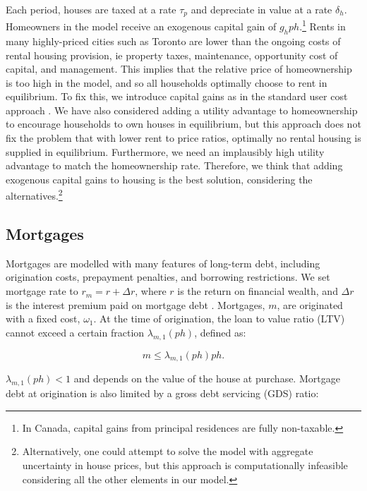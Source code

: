 \documentclass[parskip=full]{article}
\begin{document}
Each period, houses are taxed at a rate $\tau_{p}$ and depreciate in value at a rate $\delta_h$. Homeowners in the model receive an exogenous capital gain of $g_{h}ph$.\footnote{In Canada, capital gains from principal residences are fully non-taxable.} Rents in many highly-priced cities such as Toronto are lower than the ongoing costs of rental housing provision, ie property taxes, maintenance, opportunity cost of capital, and management. This implies that the relative price of homeownership is too high in the model, and so all households optimally choose to rent in equilibrium. To fix this, we introduce capital gains as in the standard user cost approach \citep{himmbelbergetal-2005}. We have also considered adding a utility advantage to homeownership to encourage households to own houses in equilibrium, but this approach does not fix the problem that with lower rent to price ratios, optimally no rental housing is supplied in equilibrium. Furthermore, we need an implausibly high utility advantage to match the homeownership rate. Therefore, we think that adding exogenous capital gains to housing is the best solution, considering the alternatives.\footnote{Alternatively, one could attempt to solve the model with aggregate uncertainty in house prices, but this approach is computationally infeasible considering all the other elements in our model.}

\subsection{Mortgages}\label{subsection:morgtages}

Mortgages are modelled with many features of long-term debt, including origination costs, prepayment penalties, and borrowing restrictions. We set mortgage rate to $r_{m}=r+\Delta r$, where $r$ is the return on financial wealth, and $\Delta r$ is the interest premium paid on mortgage debt \citep{sommeretal-2013,sommersullivan-2017,kaplanetal-2019}. Mortgages, $m$, are originated with a fixed cost, $\omega_{1}$. At the time of origination, the loan to value ratio (LTV) cannot exceed a certain fraction $\lambda_{m,1}(ph)$, defined as:

\begin{equation}\label{eq:LTV}
m \leq \lambda_{m,1}(ph) p h.
\end{equation}

\noindent $\lambda_{m,1}(ph)<1$ and depends on the value of the house at purchase. Mortgage debt at origination is also limited by a gross debt servicing (GDS) ratio: 
\end{document}
